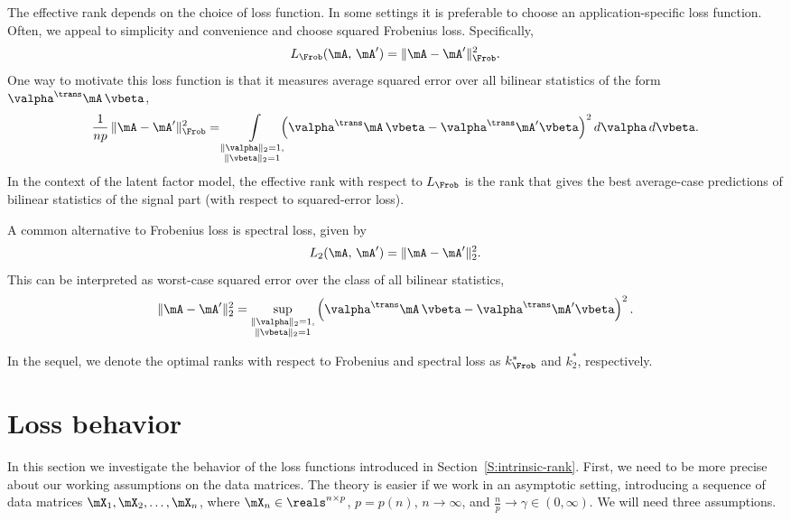 The effective rank depends on the choice of loss function.  In some settings it is preferable to choose an application-specific loss function.  Often, we appeal to simplicity and convenience and choose squared Frobenius loss.  Specifically,
\[
    L_\Frob ( \mA, \, \mA' )
        = \| \mA - \mA' \|_\Frob^2.
\]
One way to motivate this loss function is that it measures average squared error over all bilinear statistics of the form 
$\valpha^\trans \mA \, \vbeta$,
\[
    \frac{1}{np} \,
    \| \mA - \mA' \|_\Frob^2
    =
    \int\limits_{ \substack{ \| \valpha \|_2 = 1, \\
                             \| \vbeta \|_2  = 1 } }
        \!\!\!\!
        \left(
            \valpha^\trans \mA \, \vbeta
            -
            \valpha^\trans \mA' \vbeta
        \right)^2
        d\valpha \,
        d\vbeta.
\]
In the context of the latent factor model, the effective rank with respect
to $L_\Frob$ is the rank that gives the best average-case predictions of 
bilinear statistics of the signal part (with respect to squared-error loss). 

A common alternative to Frobenius loss is spectral loss, given by
\[
    L_2 ( \mA, \, \mA' )
        = \| \mA - \mA' \|_2^2.
\]
This can be interpreted as worst-case squared error over the class of all 
bilinear statistics,
\[
    \| \mA - \mA' \|_2^2
        =
            \sup_{ \substack{ \| \valpha \|_2 = 1, \\
                              \| \vbeta \|_2  = 1 } }
                \left(
                    \valpha^\trans \mA \, \vbeta
                    -
                    \valpha^\trans \mA' \vbeta
                \right)^2.
\]

In the sequel, we denote the optimal ranks with respect to Frobenius and
spectral loss as $k^\ast_\Frob$ and $k^\ast_2$, respectively.


\section{Loss behavior}\label{S:loss-behavior}

In this section we investigate the behavior of the loss functions introduced
in Section~\ref{S:intrinsic-rank}.  First, we need to be more precise about
our working assumptions on the data matrices.  The theory is easier if we
work in an asymptotic setting, introducing a sequence of data matrices
$\mX_1, \mX_2, \ldots, \mX_n$, where $\mX_n \in \reals^{n \times p}$, $p = p(n)$, $n \to \infty$, and $\frac{n}{p} \to \gamma \in (0,\infty)$.  We
will need three assumptions.

